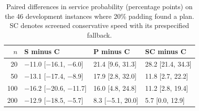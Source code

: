 \begin{table}[t]
\centering
\small
\caption{Paired differences in service probability (percentage points) on the 46 development instances where 20\% padding found a plan. SC denotes screened conservative speed with its prespecified fallback.}
\label{tab:paired}
\begin{tabular}{rlll}
\toprule
$n$ & S minus C & P minus C & SC minus C\\
\midrule
20 & $-$11.0 [$-$16.1, $-$6.0] & 21.4 [9.6, 31.3] & 28.2 [21.4, 34.3]\\
50 & $-$13.1 [$-$17.4, $-$8.9] & 17.9 [2.8, 32.0] & 11.8 [2.7, 22.2]\\
100 & $-$16.2 [$-$20.6, $-$11.7] & 16.0 [4.8, 24.8] & 11.2 [2.8, 19.4]\\
200 & $-$12.9 [$-$18.5, $-$5.7] & 8.3 [$-$5.1, 20.0] & 5.7 [0.0, 12.9]\\
\bottomrule
\end{tabular}
\end{table}
